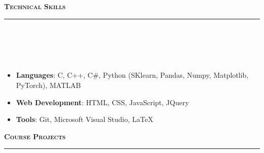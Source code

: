 \documentclass[a4paper,10pt]{article}
\newcommand{\lsep}{-0.5cm}
\newcommand{\resheading}[1]{{\small
        {
            \begin{minipage}
                {0.992\textwidth}\textbf{{\textsc{#1 \vphantom{p\^{E}} }}}
                \\[-0.3cm]
                \hrule
            \end{minipage}
            \\[-0.5cm]
        }
 }}
\begin{document}
\resheading{\textbf{\large Technical Skills}}\\[\lsep] 
\\[-0.3cm]
\begin{itemize}
  \item \textbf{Languages}: C, C++, C\#, Python (SKlearn, Pandas, Numpy, Matplotlib, PyTorch), MATLAB\\[-0.6cm]
  \item \textbf{Web Development}: HTML, CSS,
  JavaScript, JQuery\\[-0.6cm]
  \item \textbf{Tools}: Git, Microsoft Visual Studio, \LaTeX \\[-0.5cm]
\end{itemize}
\resheading{\textbf{\large Course Projects}}\\[\lsep]
\\[-0.2cm]
\end{document}
